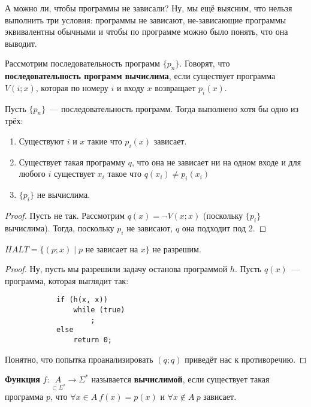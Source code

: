 \documentclass{article}
\begin{document}
    \begin{remark}
        А можно ли, чтобы программы не зависали? Ну, мы ещё выясним, что нельзя выполнить три условия: программы не зависают, не-зависающие программы эквивалентны обычными и чтобы по программе можно было понять, что она выводит.
    \end{remark}
    \begin{definition}
        Рассмотрим последовательность программ $\{p_n\}$. Говорят, что \textbf{последовательность программ вычислима}, если существует программа $V(i;x)$, которая по номеру $i$ и входу $x$ возвращает $p_i(x)$.
    \end{definition}
    \begin{theorem}
        Пусть $\{p_n\}$~--- последовательность программ. Тогда выполнено хотя бы одно из трёх:
        \begin{enumerate}
            \item Существуют $i$ и $x$ такие что $p_i(x)$ зависает.
            \item Существует такая программу $q$, что она не зависает ни на одном входе и для любого $i$ существует $x_i$ такое что $q(x_i)\neq p_i(x_i)$
            \item $\{p_i\}$ не вычислима.
        \end{enumerate}
    \end{theorem}
    \begin{proof}
        Пусть не так. Рассмотрим $q(x)=\neg V(x;x)$ (поскольку $\{p_i\}$ вычислима). Тогда, поскольку $p_i$ не зависают, $q$ она подходит под 2.
    \end{proof}
    \begin{claim}
        $HALT=\{(p;x)\mid p\text{ не зависает на }x\}$ не разрешим.
    \end{claim}
    \begin{proof}
        Ну, пусть мы разрешили задачу останова программой $h$. Пусть $q(x)$~--- программа, которая выглядит так:
        \begin{verbatim}
            if (h(x, x))
                while (true)
                    ;
            else
                return 0;
        \end{verbatim}
        Понятно, что попытка проанализировать $(q;q)$ приведёт нас к противоречию.
    \end{proof}
    \begin{definition}
        \textbf{Функция} $f\colon\underset{\subset\Sigma^*}A\to\Sigma^*$ называется \textbf{вычислимой}, если существует такая программа $p$, что $\forall x\in A~f(x)=p(x)$ и $\forall x\notin A~p$ зависает.
    \end{definition}
\end{document}
